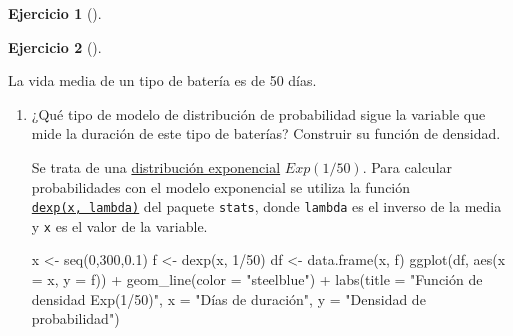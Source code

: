 \documentclass[
  a4paper,
]{scrreport}
\newenvironment{Shaded}{\begin{snugshade}}{\end{snugshade}}
\newcommand{\AttributeTok}[1]{\textcolor[rgb]{0.40,0.45,0.13}{#1}}
\newcommand{\DecValTok}[1]{\textcolor[rgb]{0.68,0.00,0.00}{#1}}
\newcommand{\FloatTok}[1]{\textcolor[rgb]{0.68,0.00,0.00}{#1}}
\newcommand{\FunctionTok}[1]{\textcolor[rgb]{0.28,0.35,0.67}{#1}}
\newcommand{\NormalTok}[1]{\textcolor[rgb]{0.00,0.23,0.31}{#1}}
\newcommand{\OtherTok}[1]{\textcolor[rgb]{0.00,0.23,0.31}{#1}}
\newcommand{\SpecialCharTok}[1]{\textcolor[rgb]{0.37,0.37,0.37}{#1}}
\newcommand{\StringTok}[1]{\textcolor[rgb]{0.13,0.47,0.30}{#1}}
\theoremstyle{definition}
\newtheorem{exercise}{Ejercicio}[chapter]
\theoremstyle{remark}
\begin{document}
\begin{exercise}[]
\begin{enumerate}
\begin{tcolorbox}
  \end{tcolorbox}
\end{enumerate}

\end{exercise}

\begin{exercise}[]\protect\hypertarget{exr-distribuciones-probabilidad-5}{}\label{exr-distribuciones-probabilidad-5}

La vida media de un tipo de batería es de 50 días.

\begin{enumerate}
\def\labelenumi{\alph{enumi}.}
\item
  ¿Qué tipo de modelo de distribución de probabilidad sigue la variable
  que mide la duración de este tipo de baterías? Construir su función de
  densidad.

  \begin{tcolorbox}[enhanced jigsaw, toprule=.15mm, rightrule=.15mm, arc=.35mm, colback=white, colbacktitle=quarto-callout-tip-color!10!white, toptitle=1mm, left=2mm, colframe=quarto-callout-tip-color-frame, opacityback=0, breakable, opacitybacktitle=0.6, bottomtitle=1mm, titlerule=0mm, title=\textcolor{quarto-callout-tip-color}{\faLightbulb}\hspace{0.5em}{Solución}, bottomrule=.15mm, coltitle=black, leftrule=.75mm]

  Se trata de una
  \href{https://es.wikipedia.org/wiki/Distribuci\%C3\%B3n_exponencial}{distribución
  exponencial} \(Exp(1/50)\). Para calcular probabilidades con el modelo
  exponencial se utiliza la función
  \href{https://www.rdocumentation.org/packages/stats/versions/3.3/topics/Exponential}{\texttt{dexp(x,\ lambda)}}
  del paquete \texttt{stats}, donde \texttt{lambda} es el inverso de la
  media y \texttt{x} es el valor de la variable.

\begin{Shaded}
\begin{Highlighting}[]
\NormalTok{x }\OtherTok{\textless{}{-}} \FunctionTok{seq}\NormalTok{(}\DecValTok{0}\NormalTok{,}\DecValTok{300}\NormalTok{,}\FloatTok{0.1}\NormalTok{)}
\NormalTok{f }\OtherTok{\textless{}{-}} \FunctionTok{dexp}\NormalTok{(x, }\DecValTok{1}\SpecialCharTok{/}\DecValTok{50}\NormalTok{)}
\NormalTok{df }\OtherTok{\textless{}{-}} \FunctionTok{data.frame}\NormalTok{(x, f)}
\FunctionTok{ggplot}\NormalTok{(df, }\FunctionTok{aes}\NormalTok{(}\AttributeTok{x =}\NormalTok{ x, }\AttributeTok{y =}\NormalTok{ f)) }\SpecialCharTok{+}
    \FunctionTok{geom\_line}\NormalTok{(}\AttributeTok{color =} \StringTok{"steelblue"}\NormalTok{) }\SpecialCharTok{+}
    \FunctionTok{labs}\NormalTok{(}\AttributeTok{title =} \StringTok{"Función de densidad Exp(1/50)"}\NormalTok{, }\AttributeTok{x =} \StringTok{"Días de duración"}\NormalTok{, }\AttributeTok{y =} \StringTok{"Densidad de probabilidad"}\NormalTok{)}
\end{Highlighting}
\end{Shaded}


\end{tcolorbox}
\end{enumerate}
\end{exercise}
\end{document}
